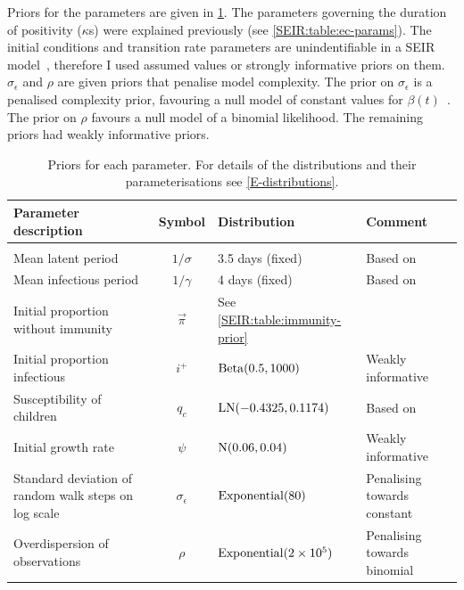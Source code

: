 \documentclass[thesis.tex]{subfiles}
\begin{document}
Priors for the parameters are given in \cref{SEIR:table:priors}.
The parameters governing the duration of positivity ($\kappa$s) were explained previously (see \cref{SEIR:table:ec-params}).
The initial conditions and transition rate parameters are unindentifiable in a SEIR model~\autocite{dankwaStructural}, therefore I used assumed values or strongly informative priors on them.
$\sigma_\epsilon$ and $\rho$ are given priors that penalise model complexity.
The prior on $\sigma_\epsilon$ is a penalised complexity prior, favouring a null model of constant values for $\beta(t)$~\autocite{simpsonPenalising}.
The prior on $\rho$ favours a null model of a binomial likelihood.
The remaining priors had weakly informative priors.

\begin{landscape}
\begin{table}
\begin{tabular}{l c l l}
    Parameter description & Symbol & Distribution & Comment \\
    \hline \\
    Mean latent period & $1/\sigma$ & 3.5 days (fixed) & Based on \textcite{zhaoEstimating} \\
    Mean infectious period & $1/\gamma$ & 4 days (fixed) & Based on \textcite{zhaoEstimating} \\
    Initial proportion without immunity & $\vec\pi$ & See \cref{SEIR:table:immunity-prior} & \\
    Initial proportion infectious & $i^+$ & $\operatorname{Beta}(0.5, 1000)$ & Weakly informative \\
    Susceptibility of children & $q_c$ & $\operatorname{LN}(-0.4325, 0.1174)$ & Based on \textcite{vinerTransmission}  \\
    Initial growth rate & $\psi$ & $\operatorname{N}(0.06, 0.04)$ & Weakly informative \\
    Standard deviation of random walk steps on log scale & $\sigma_\epsilon$ & $\operatorname{Exponential}(80)$ & Penalising towards constant \\
    Overdispersion of observations & $\rho$ & $\operatorname{Exponential}(2 \times 10^5)$ & Penalising towards binomial
\end{tabular}
\caption[SEIR model priors]{Priors for each parameter. For details of the distributions and their parameterisations see \cref{E-distributions}.}
\label{SEIR:table:priors}
\end{table}


\end{landscape}
\end{document}
